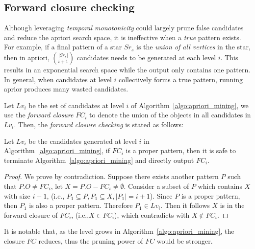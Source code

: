 \subsection{Forward closure checking}
Although leveraging \emph{temporal monotonicity} could largely prune false candidates and reduce
the apriori search space, it is ineffective when a \textit{true} pattern exists. 
For example, if a final pattern of a star $Sr_s$ is the \textit{union of all vertices} in the star, 
then in apriori, ${|Sr_s|}\choose{i + 1}$ candidates needs to be generated at 
each level $i$. This results in an exponential search space while
the output only contains one pattern.  
In general, when candidates at level $i$ collectively forms a true pattern, 
running aprior produces many wasted candidates. 

Let $Lv_i$ be the set of candidates at level $i$ of Algorithm~\ref{algo:apriori_mining},
we use the \emph{forward closure} $FC_i$ to denote the union of the objects in
all candidates in $Lv_i$. Then, the \emph{forward closure checking} is stated as follows:
\begin{theorem}
Let $Lv_i$ be the candidates generated at level $i$ in Algorithm~\ref{algo:apriori_mining},
if $FC_i$ is a proper pattern, then it is safe to terminate Algorithm~\ref{algo:apriori_mining}
and directly output $FC_i$.
\end{theorem}

\begin{proof}
We prove by contradiction. Suppose there exists another pattern $P$ such that $P.O \neq FC_i$, let 
$X=P.O - FC_i \neq \emptyset$. Consider a subset of $P$ which contains $X$ with size $i+1$, (i.e., $P_1 \subseteq P, P_1\subseteq X, |P_1|=i+1$). Since $P$ is a proper pattern, then $P_1$ is also a proper pattern. Therefore $P_1 \in Lv_i$.
Then it follows $X$ is in the forward closure of $FC_i$, (i.e.,$X \in FC_i$), which contradicts with $X\notin FC_i$.
\end{proof}

It is notable that, as the level grows in Algorithm~\ref{algo:apriori_mining}, the closure $FC$
reduces, thus the pruning power of $FC$ would be stronger.

%

